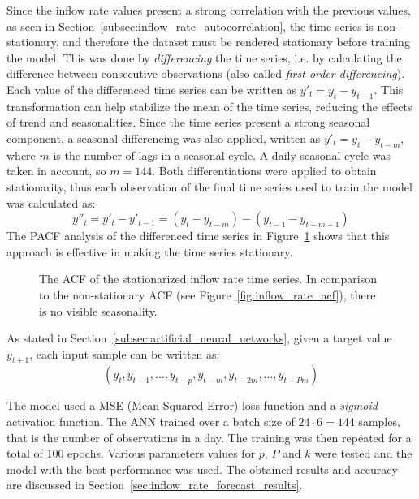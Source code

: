 Since the inflow rate values present a strong correlation with the previous values, as seen in Section~\ref{subsec:inflow_rate_autocorrelation}, the time series is non-stationary, and therefore the dataset must be rendered stationary before training the model. This was done by \emph{differencing} the time series, i.e. by calculating the difference between consecutive observations (also called \emph{first-order differencing}). Each value of the differenced time series can be written as \( y'_t = y_t - y_{t-1} \). This transformation can help stabilize the mean of the time series, reducing the effects of trend and seasonalities. Since the time series present a strong seasonal component, a seasonal differencing was also applied, written as \( y'_t = y_t - y_{t-m} \), where \( m \) is the number of lags in a seasonal cycle. A daily seasonal cycle was taken in account, so \( m = 144 \). Both differentiations were applied to obtain stationarity, thus each observation of the final time series used to train the model was calculated as:
\begin{equation}
  y''_t = y'_t - y'_{t-1} = (y_t - y_{t-m}) - (y_{t-1} - y_{t-m-1})
\end{equation}
The PACF analysis of the differenced time series in Figure~\ref{fig:stationary_inflow_rate_acf} shows that this approach is effective in making the time series stationary.

\begin{figure}
  \begin{center}
  \end{center}
  \caption{The ACF of the stationarized inflow rate time series. In comparison to the non-stationary ACF (see Figure~\ref{fig:inflow_rate_acf}), there is no visible seasonality.}
  \label{fig:stationary_inflow_rate_acf}
\end{figure}

As stated in Section~\ref{subsec:artificial_neural_networks}, given a target value \( y_{t+1} \), each input sample can be written as:
\[
  (y_{t}, y_{t-1}, ..., y_{t-p}, y_{t-m}, y_{t-2m}, ..., y_{t-Pm})
\]

The model used a MSE (Mean Squared Error) loss function and a \emph{sigmoid} activation function. The ANN trained over a batch size of \( 24 \cdot 6 = 144 \) samples, that is the number of observations in a day. The training was then repeated for a total of \( 100 \) epochs. Various parameters values for \( p \), \( P \) and \( k \) were tested and the model with the best performance was used. The obtained results and accuracy are discussed in Section~\ref{sec:inflow_rate_forecast_results}.

